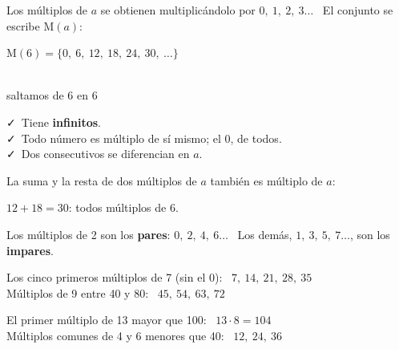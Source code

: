 \documentclass[11pt,a4paper]{article}
\newcommand{\comic}{\fontfamily{ComicNeue-TLF}\selectfont}
\begin{document}
\vfill
\begin{idea}[Múltiplos]
Los múltiplos de $a$ se obtienen multiplicándolo por $0,\ 1,\ 2,\ 3\ldots$ \ El conjunto se escribe $\text{M}(a)$:\\[4pt]
{\centering\Large$\text{M}(6)=\{0,\ 6,\ 12,\ 18,\ 24,\ 30,\ \ldots\}$\par}
\end{idea}

\vfill
\begin{center}
\\
{\comic\small\color{fmmuted}saltamos de 6 en 6}
\end{center}

\vfill
\begin{tcbraster}[raster columns=2,raster equal height,raster column skip=10pt]
\begin{tcolorbox}[fmbase,colback=fmK!8,colframe=fmK,coltitle=white,title={Propiedades}]
\faCheck\ Tiene \textbf{infinitos}.\\
\faCheck\ Todo número es múltiplo de sí mismo; el 0, de todos.\\
\faCheck\ Dos consecutivos se diferencian en $a$.
\end{tcolorbox}
\begin{tcolorbox}[fmbase,colback=fmA!8,colframe=fmA,coltitle=white,title={Sumas y restas}]
La suma y la resta de dos múltiplos de $a$ también es múltiplo de $a$:\par\smallskip
$12+18=30$: todos múltiplos de 6.
\end{tcolorbox}
\end{tcbraster}

\vfill
\begin{truc}
Los múltiplos de 2 son los \textbf{pares}: $0,\ 2,\ 4,\ 6\ldots$ \ Los demás, $1,\ 3,\ 5,\ 7\ldots$, son los \textbf{impares}.
\end{truc}

\vfill
\begin{exemple}[Ejemplos]
\begin{minipage}[t]{0.48\linewidth}
Los cinco primeros múltiplos de 7 (sin el 0): \ $7,\ 14,\ 21,\ 28,\ 35$\\[4pt]
Múltiplos de 9 entre 40 y 80: \ $45,\ 54,\ 63,\ 72$
\end{minipage}\hfill
\begin{minipage}[t]{0.49\linewidth}
El primer múltiplo de 13 mayor que 100: \ $13\cdot8=\boxed{104}$\\[4pt]
Múltiplos comunes de 4 y 6 menores que 40: \ $12,\ 24,\ 36$
\end{minipage}
\end{exemple}
\end{document}
